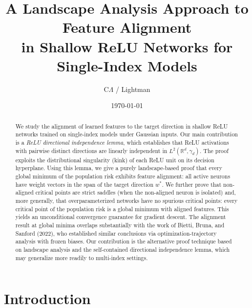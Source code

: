 \documentclass[11pt]{amsart}
\theoremstyle{definition}
\newcommand{\R}{\mathbb{R}}
\begin{document}
\title[Landscape Analysis for Feature Alignment]{A Landscape Analysis Approach to Feature Alignment\\in Shallow ReLU Networks for Single-Index Models}

\author{C$\Lambda$ / Lightman}
\address{}

\date{\today}



\begin{abstract}
We study the alignment of learned features to the target direction in shallow ReLU networks trained on single-index models under Gaussian inputs. Our main contribution is a \emph{ReLU directional independence lemma}, which establishes that ReLU activations with pairwise distinct directions are linearly independent in $L^2(\R^d, \gamma_d)$. The proof exploits the distributional singularity (kink) of each ReLU unit on its decision hyperplane. Using this lemma, we give a purely landscape-based proof that every global minimum of the population risk exhibits feature alignment: all active neurons have weight vectors in the span of the target direction $w^*$. We further prove that non-aligned critical points are strict saddles (when the non-aligned neuron is isolated) and, more generally, that overparameterized networks have no spurious critical points: every critical point of the population risk is a global minimum with aligned features. This yields an unconditional convergence guarantee for gradient descent. The alignment result at global minima overlaps substantially with the work of Bietti, Bruna, and Sanford (2022), who established similar conclusions via optimization-trajectory analysis with frozen biases. Our contribution is the alternative proof technique based on landscape analysis and the self-contained directional independence lemma, which may generalize more readily to multi-index settings.
\end{abstract}

\maketitle

\section{Introduction}\label{sec:intro}
\end{document}
